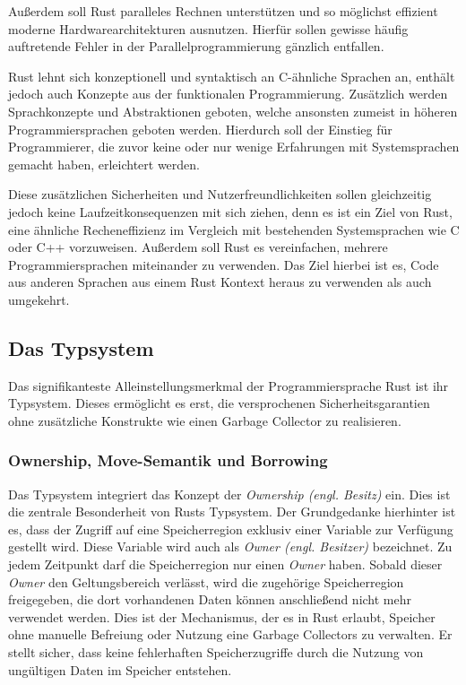 Außerdem soll Rust paralleles Rechnen unterstützen und
so möglichst effizient moderne Hardwarearchitekturen ausnutzen.
Hierfür sollen gewisse häufig auftretende Fehler in der Parallelprogrammierung gänzlich entfallen.
\cite{theRustLanguage}

Rust lehnt sich konzeptionell und syntaktisch an C-ähnliche Sprachen an, enthält jedoch auch Konzepte aus der
funktionalen Programmierung. Zusätzlich werden Sprachkonzepte und Abstraktionen geboten, welche
ansonsten zumeist in höheren Programmiersprachen geboten werden. Hierdurch soll der Einstieg für
Programmierer, die zuvor keine oder nur wenige Erfahrungen mit Systemsprachen gemacht haben, erleichtert werden.
\cite{engineeringServo}

Diese zusätzlichen Sicherheiten und Nutzerfreundlichkeiten sollen gleichzeitig jedoch keine Laufzeitkonsequenzen mit 
sich ziehen, denn es ist ein Ziel von Rust, 
eine ähnliche Recheneffizienz im Vergleich mit bestehenden Systemsprachen wie C oder C++ vorzuweisen.
Außerdem soll Rust es vereinfachen, mehrere Programmiersprachen miteinander zu verwenden.
Das Ziel hierbei ist es, Code aus anderen Sprachen aus einem Rust Kontext heraus zu verwenden als auch umgekehrt.
\cite{rustBook}


\subsection{Das Typsystem}


Das signifikanteste Alleinstellungsmerkmal der Programmiersprache Rust ist ihr Typsystem. Dieses ermöglicht es
erst, die versprochenen Sicherheitsgarantien ohne zusätzliche Konstrukte wie einen Garbage
Collector zu realisieren.\cite{rustBook}

\subsubsection{Ownership, Move-Semantik und Borrowing}

Das Typsystem integriert das Konzept der \textit{Ownership (engl. Besitz)} ein.
Dies ist die zentrale Besonderheit von Rusts Typsystem.
Der Grundgedanke hierhinter ist es, dass der Zugriff auf eine Speicherregion exklusiv einer Variable
zur Verfügung gestellt wird. Diese Variable wird auch als \textit{Owner (engl. Besitzer)} bezeichnet.
Zu jedem Zeitpunkt darf die Speicherregion nur einen \textit{Owner} haben.
Sobald dieser \textit{Owner} den Geltungsbereich verlässt, wird die zugehörige Speicherregion freigegeben,
die dort vorhandenen Daten können anschließend nicht mehr verwendet werden.
Dies ist der Mechanismus, der es in Rust erlaubt, Speicher ohne manuelle Befreiung oder Nutzung eine
Garbage Collectors zu verwalten. Er stellt sicher, dass keine fehlerhaften Speicherzugriffe
durch die Nutzung von ungültigen Daten im Speicher entstehen.\cite{rustBook}

